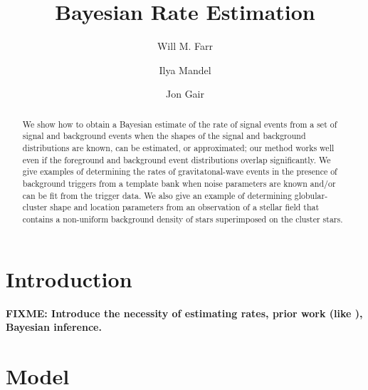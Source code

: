 \documentclass[aps,prd]{revtex4-1}
\newcommand{\fixme}[1]{\textbf{FIXME: #1}}
\begin{document}
\title{Bayesian Rate Estimation}

\author{Will M. Farr}

\author{Ilya Mandel}

\author{Jon Gair}

\begin{abstract}
  We show how to obtain a Bayesian estimate of the rate of signal
  events from a set of signal and background events when the shapes of
  the signal and background distributions are known, can be estimated,
  or approximated; our method works well even if the foreground and
  background event distributions overlap significantly.  We give
  examples of determining the rates of gravitatonal-wave events in
  the presence of background triggers from a template bank when noise
  parameters are known and/or can be fit from the trigger data.  We
  also give an example of determining globular-cluster shape and
  location parameters from an observation of a stellar field that
  contains a non-uniform background density of stars superimposed on
  the cluster stars.
\end{abstract}

\maketitle

\section{Introduction}

\fixme{Introduce the necessity of estimating rates, prior work (like
  \cite{Biswas2009}), Bayesian inference.}

\section{Model}
\end{document}
